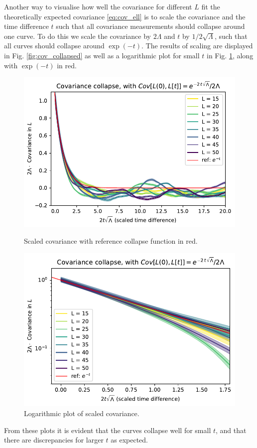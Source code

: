 Another way to visualise how well the covariance for different $L$ fit the theoretically expected covariance \eqref{eq:cov_ell} is to scale the covariance and the time difference $t$ such that all covariance measurements should collapse around one curve.
To do this we scale the covariance by $2\Lambda$ and $t$ by $1/2\sqrt{\Lambda}$, such that all curves should collapse around $\exp(-t)$.
The results of scaling are displayed in Fig. \ref{fig:cov_collapsed} as well as a logarithmic plot for small $t$ in Fig. \ref{fig:cov_log_collapsed}, along with $\exp(-t)$ in red.
\begin{figure}[ht]
    \begin{minipage}[t]{0.49\linewidth}
        \centering
        \includegraphics[width=\linewidth]{img/cov_collapsed.pdf}
        \caption{Scaled covariance with reference collapse function in red.}
        \label{fig:cov_collapsed}
    \end{minipage}
    \hfill
    \begin{minipage}[t]{0.49\linewidth}
        \centering
        \includegraphics[width=\linewidth]{img/cov_collapsed_log.pdf}
        \caption{Logarithmic plot of scaled covariance.}
        \label{fig:cov_log_collapsed}
    \end{minipage}
\end{figure}
From these plots it is evident that the curves collapse well for small $t$, and that there are discrepancies for larger $t$ as expected.


